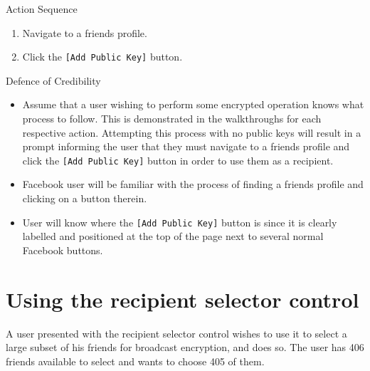 \begin{desc}

    \item[Action Sequence] \hfill
    \begin{enumerate}
        \item Navigate to a friends profile.
        \item Click the {\tt [Add Public Key]} button.
    \end{enumerate}
    
    \item[Defence of Credibility] \hfill
    \begin{itemize}
        \item Assume that a user wishing to perform some encrypted operation knows what process to follow. This is demonstrated in the walkthroughs for each respective action. Attempting this process with no public keys will result in a prompt informing the user that they must navigate to a friends profile and click the {\tt [Add Public Key]} button in order to use them as a recipient.
    
        \item Facebook user will be familiar with the process of finding a friends profile and clicking on a button therein.
        
        \item User will know where the {\tt [Add Public Key]} button is since it is clearly labelled and positioned at the top of the page next to several normal Facebook buttons.
        
    \end{itemize}
    
\end{desc}

\section{Using the recipient selector control}
\label{app:cw:sel}
A user presented with the recipient selector control wishes to use it to select a large subset of his friends for broadcast encryption, and does so. The user has 406 friends available to select and wants to choose 405 of them.

